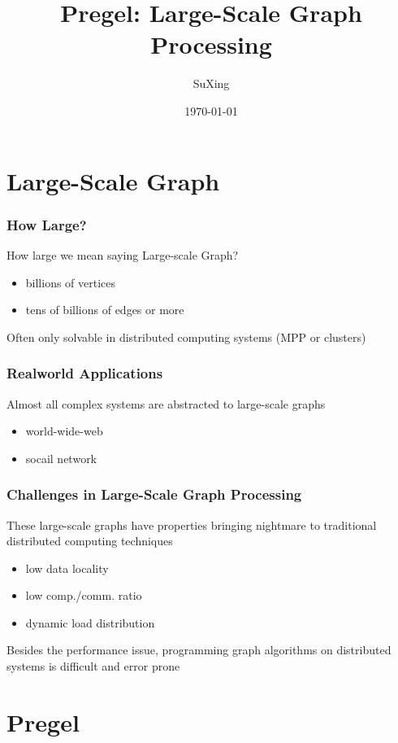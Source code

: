 \documentclass[]{beamer}
\title{Pregel: Large-Scale Graph Processing}
\author[SuXing~pysuxing@gmail.com]{SuXing}
\institute{TOW}
\date{\today}
\begin{document}
\setlength{\parindent}{0pt}

\frame{\titlepage}
\frame{\tableofcontents}

\section{Large-Scale Graph}
\frame{\tableofcontents[currentsection]}

\begin{frame}
  \frametitle{How Large?}
  How large we mean saying \alert{Large-scale} Graph?
  \begin{itemize}
    \item billions of vertices
    \item tens of billions of edges or more
  \end{itemize}

  \pause
  Often only solvable in distributed computing systems (MPP or clusters)
\end{frame}

\begin{frame}
  \frametitle{Realworld Applications}
  Almost all complex systems are abstracted to large-scale graphs
  \begin{itemize}
    \item world-wide-web
    \item socail network
  \end{itemize}
\end{frame}

\begin{frame}
  \frametitle{Challenges in Large-Scale Graph Processing}
  These large-scale graphs have properties bringing nightmare to
  traditional distributed computing techniques
  \begin{itemize}
    \item low data locality
    \item low comp./comm. ratio
    \item dynamic load distribution
  \end{itemize}

  \pause
  Besides the performance issue, programming graph algorithms on distributed systems
  is difficult and error prone
\end{frame}

\section{Pregel}
\frame{\tableofcontents[currentsection]}
\end{document}
